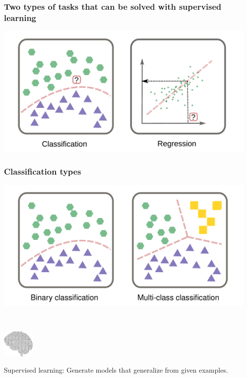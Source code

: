 \documentclass[aspectratio=169]{beamer}
\begin{document}
\begin{frame}
  \frametitle{Two types of tasks that can be solved with supervised learning}
  \begin{center}
    \includegraphics[width=13cm]{images/classification_and_regression.pdf}
  \end{center}
\end{frame}

\begin{frame}
  \frametitle{Classification types}
  \begin{center}
    \includegraphics[width=13cm]{images/binary_vs_multi-class_classification.pdf}
  \end{center}  
\end{frame}


\begin{frame}
  \begin{block}{}
    \vspace{0.5cm}
    \ \ \ \
    \begin{minipage}{0.10\textwidth}
      \begin{center}
        \includegraphics[width=1.6cm]{images/publicdomainvectors_Random-Alphabet-Brain.pdf}
      \end{center}        
    \end{minipage}
    \hfill
    \begin{minipage}{0.80\textwidth}
      Supervised learning: Generate models that generalize from
      given examples.
    \end{minipage}
    \vspace{0.3cm}
  \end{block}
\end{frame}
\end{document}
